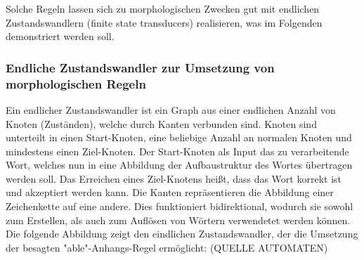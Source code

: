 \documentclass[12pt]{paper}
\begin{document}
Solche Regeln lassen sich zu morphologischen Zwecken gut mit endlichen Zustandswandlern (finite state transducers) realisieren, was im Folgenden demonstriert werden soll.

\subsubsection{Endliche Zustandswandler zur Umsetzung von morphologischen Regeln}
Ein endlicher Zustandswandler ist ein Graph aus einer endlichen Anzahl von Knoten (Zuständen), welche durch Kanten verbunden sind. Knoten sind unterteilt in einen Start-Knoten, eine beliebige Anzahl an normalen Knoten und mindestens einen Ziel-Knoten. Der Start-Knoten als Input das zu verarbeitende Wort, welches nun in eine Abbildung der Aufbaustruktur des Wortes übertragen werden soll. Das Erreichen eines Ziel-Knotens heißt, dass das Wort korrekt ist und akzeptiert werden kann. Die Kanten repräsentieren die Abbildung einer Zeichenkette auf eine andere. Dies funktioniert bidirektional, wodurch sie sowohl zum Erstellen, als auch zum Auflösen von Wörtern verwendetet werden können. Die folgende Abbildung zeigt den eindlichen Zustandswandler, der die Umsetzung der besagten "able"-Anhangs-Regel ermöglicht: (QUELLE AUTOMATEN)
\\
\\
\begin{center}
\end{center}
\end{document}
